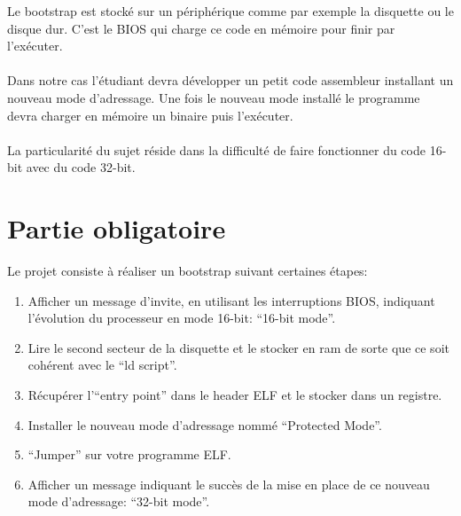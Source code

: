\documentclass[10pt,a4wide]{article}
\begin{document}
Le bootstrap est stock\'e sur un p\'eriph\'erique comme par exemple la
disquette ou le disque dur. C'est le BIOS qui charge ce code en m\'emoire
pour finir par l'ex\'ecuter.

\paragraph{}

Dans notre cas l'\'etudiant devra d\'evelopper un petit code assembleur
installant un nouveau mode d'adressage. Une fois le nouveau mode install\'e
le programme devra charger en m\'emoire un binaire puis l'ex\'ecuter.

\paragraph{}

La particularit\'e du sujet r\'eside dans la difficult\'e de faire fonctionner
du code 16-bit avec du code 32-bit.

\section{Partie obligatoire}

Le projet consiste \`a r\'ealiser un bootstrap suivant certaines \'etapes:

\begin{enumerate}

\item Afficher un message d'invite, en utilisant les interruptions BIOS,
      indiquant l'\'evolution du processeur en mode 16-bit: ``16-bit mode''.

\item Lire le second secteur de la disquette et le stocker en ram de sorte
      que ce soit coh\'erent avec le ``ld script''.

\item R\'ecup\'erer l'``entry point'' dans le header ELF et le stocker
      dans un registre.

\item Installer le nouveau mode d'adressage nomm\'e ``Protected Mode''.

\item ``Jumper'' sur votre programme ELF.

\item Afficher un message indiquant le succ\`es de la mise en place de ce
      nouveau mode d'adressage: ``32-bit mode''.

\end{enumerate}
\end{document}
